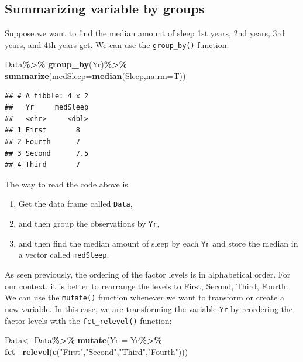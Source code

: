\documentclass[
]{book}
\newenvironment{Shaded}{\begin{snugshade}}{\end{snugshade}}
\newcommand{\AttributeTok}[1]{\textcolor[rgb]{0.13,0.29,0.53}{#1}}
\newcommand{\FunctionTok}[1]{\textcolor[rgb]{0.13,0.29,0.53}{\textbf{#1}}}
\newcommand{\NormalTok}[1]{#1}
\newcommand{\OtherTok}[1]{\textcolor[rgb]{0.56,0.35,0.01}{#1}}
\newcommand{\SpecialCharTok}[1]{\textcolor[rgb]{0.81,0.36,0.00}{\textbf{#1}}}
\newcommand{\StringTok}[1]{\textcolor[rgb]{0.31,0.60,0.02}{#1}}
\providecommand{\tightlist}{%
  \setlength{\itemsep}{0pt}\setlength{\parskip}{0pt}}
\begin{document}
\hypertarget{summarizing-variable-by-groups-1}{%
\subsection{Summarizing variable by groups}\label{summarizing-variable-by-groups-1}}

Suppose we want to find the median amount of sleep 1st years, 2nd years, 3rd years, and 4th years get. We can use the \texttt{group\_by()} function:

\begin{Shaded}
\begin{Highlighting}[]
\NormalTok{Data}\SpecialCharTok{\%\textgreater{}\%}
  \FunctionTok{group\_by}\NormalTok{(Yr)}\SpecialCharTok{\%\textgreater{}\%}
  \FunctionTok{summarize}\NormalTok{(}\AttributeTok{medSleep=}\FunctionTok{median}\NormalTok{(Sleep,}\AttributeTok{na.rm=}\NormalTok{T))}
\end{Highlighting}
\end{Shaded}

\begin{verbatim}
## # A tibble: 4 x 2
##   Yr     medSleep
##   <chr>     <dbl>
## 1 First       8  
## 2 Fourth      7  
## 3 Second      7.5
## 4 Third       7
\end{verbatim}

The way to read the code above is

\begin{enumerate}
\def\labelenumi{\arabic{enumi}.}
\tightlist
\item
  Get the data frame called \texttt{Data},
\item
  and then group the observations by \texttt{Yr},
\item
  and then find the median amount of sleep by each \texttt{Yr} and store the median in a vector called \texttt{medSleep}.
\end{enumerate}

As seen previously, the ordering of the factor levels is in alphabetical order. For our context, it is better to rearrange the levels to First, Second, Third, Fourth. We can use the \texttt{mutate()} function whenever we want to transform or create a new variable. In this case, we are transforming the variable \texttt{Yr} by reordering the factor levels with the \texttt{fct\_relevel()} function:

\begin{Shaded}
\begin{Highlighting}[]
\NormalTok{Data}\OtherTok{\textless{}{-}}\NormalTok{ Data}\SpecialCharTok{\%\textgreater{}\%}
  \FunctionTok{mutate}\NormalTok{(}\AttributeTok{Yr =}\NormalTok{ Yr}\SpecialCharTok{\%\textgreater{}\%}
           \FunctionTok{fct\_relevel}\NormalTok{(}\FunctionTok{c}\NormalTok{(}\StringTok{"First"}\NormalTok{,}\StringTok{"Second"}\NormalTok{,}\StringTok{"Third"}\NormalTok{,}\StringTok{"Fourth"}\NormalTok{)))}
\end{Highlighting}
\end{Shaded}
\end{document}
